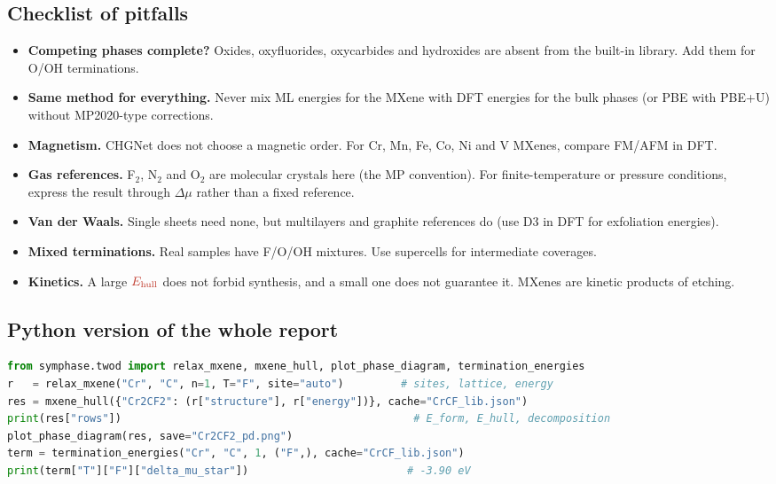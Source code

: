 \documentclass[11pt,a4paper]{article}
\newcommand{\Eh}{\textcolor{ecol}{E_{\mathrm{hull}}}}
\begin{document}
\subsection{Checklist of pitfalls}
\begin{caveat}
\begin{itemize}
\item \textbf{Competing phases complete?} Oxides, oxyfluorides, oxycarbides and hydroxides are absent from the built-in library. Add them for O/OH terminations.
\item \textbf{Same method for everything.} Never mix ML energies for the MXene with DFT energies for the bulk phases (or PBE with PBE+U) without MP2020-type corrections.
\item \textbf{Magnetism.} CHGNet does not choose a magnetic order. For Cr, Mn, Fe, Co, Ni and V MXenes, compare FM/AFM in DFT.
\item \textbf{Gas references.} F$_2$, N$_2$ and O$_2$ are molecular crystals here (the MP convention). For finite-temperature or pressure conditions, express the result
through $\Delta\mu$ rather than a fixed reference.
\item \textbf{Van der Waals.} Single sheets need none, but multilayers and graphite references do (use D3 in DFT for exfoliation energies).
\item \textbf{Mixed terminations.} Real samples have F/O/OH mixtures. Use supercells for intermediate coverages.
\item \textbf{Kinetics.} A large $\Eh$ does not forbid synthesis, and a small one does not guarantee it. MXenes are kinetic products of etching.
\end{itemize}
\end{caveat}

\subsection{Python version of the whole report}
\begin{lstlisting}[language=Python]
from symphase.twod import relax_mxene, mxene_hull, plot_phase_diagram, termination_energies
r   = relax_mxene("Cr", "C", n=1, T="F", site="auto")         # sites, lattice, energy
res = mxene_hull({"Cr2CF2": (r["structure"], r["energy"])}, cache="CrCF_lib.json")
print(res["rows"])                                              # E_form, E_hull, decomposition
plot_phase_diagram(res, save="Cr2CF2_pd.png")
term = termination_energies("Cr", "C", 1, ("F",), cache="CrCF_lib.json")
print(term["T"]["F"]["delta_mu_star"])                         # -3.90 eV
\end{lstlisting}
\end{document}
